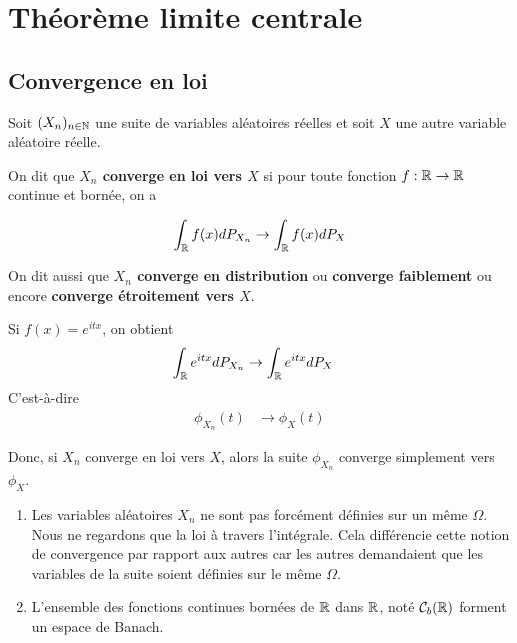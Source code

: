 \chapter{Théorème limite centrale}

\label{chapter:theoreme_limite_centrale}

\section{Convergence en loi}

\begin{definition}
	Soit $(X_{n})_{n \in \mathbb{N}}$ une suite de variables aléatoires réelles et
	soit $X$ une autre variable aléatoire réelle.

	On dit que \textbf{$X_{n}$ converge en loi vers $X$} si
	pour toute fonction $f : \mathbb{R} \rightarrow \mathbb{R}$ continue et bornée, on a

	\begin{equation}
		\int_{\mathbb{R}} f(x) dP_{X_{n}} \rightarrow \int_{\mathbb{R}} f(x) dP_{X}
	\end{equation}

	On dit aussi que \textbf{$X_{n}$ converge en distribution} ou \textbf{converge
	faiblement} ou encore \textbf{converge étroitement vers $X$}.
\end{definition}

\begin{remarque}
	Si $f(x) = e^{itx}$, on obtient
	\begin{align}
		\int_{\mathbb{R}} e^{itx} dP_{X_{n}} &\rightarrow \int_{\mathbb{R}} e^{itx} dP_{X}
	\end{align}
	C'est-à-dire
	\begin{align}
		\phi_{X_{n}}(t) &\rightarrow \phi_{X}(t)
	\end{align}

	Donc, si $X_{n}$ converge en loi vers $X$, alors la suite $\phi_{X_{n}}$
	converge simplement vers $\phi_{X}$.
\end{remarque}

\begin{remarque}
	\begin{enumerate}
		\item Les variables aléatoires $X_{n}$ ne sont pas forcément définies sur un même
		$\Omega$. Nous ne regardons que la loi à travers l'intégrale. Cela
		différencie cette notion de convergence par rapport aux autres car les
		autres demandaient que les variables de la suite soient définies sur le même
		$\Omega$.
		\item L'ensemble des fonctions continues bornées de $\mathbb{R}$ dans $\mathbb{R}$, noté
		$\mathcal{C}_{b}(\mathbb{R})$ forment un espace de Banach.
	\end{enumerate}
\end{remarque}

